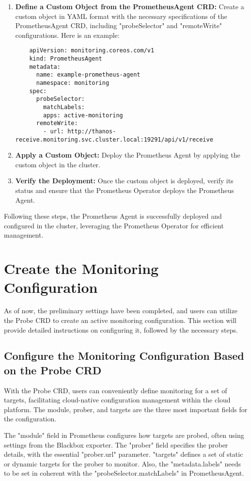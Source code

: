 \begin{enumerate}
\item \textbf{Define a Custom Object from the PrometheusAgent \ac{CRD}:}
Create a custom object in YAML format with the necessary specifications of the PrometheusAgent \ac{CRD}, including "probeSelector" and "remoteWrite" configurations. Here is an example:
\lstset{upquote=true}
\begin{lstlisting}
    apiVersion: monitoring.coreos.com/v1
    kind: PrometheusAgent
    metadata:
      name: example-prometheus-agent
      namespace: monitoring
    spec:
      probeSelector:
        matchLabels:
        apps: active-monitoring
      remoteWrite:
        - url: http://thanos-receive.monitoring.svc.cluster.local:19291/api/v1/receive
\end{lstlisting}
\item \textbf{Apply a Custom Object:}
Deploy the Prometheus Agent by applying the custom object in the cluster. 
\item \textbf{Verify the Deployment:}
Once the custom object is deployed, verify its status and ensure that the Prometheus Operator deploys the Prometheus Agent. 
\end{enumerate}

Following these steps, the Prometheus Agent is successfully deployed and configured in the cluster, leveraging the Prometheus Operator for efficient management. 

\section{Create the Monitoring Configuration}

As of now, the preliminary settings have been completed, and users can utilize the Probe \ac{CRD} to create an active monitoring configuration. This section will provide detailed instructions on configuring it, followed by the necessary steps. 

\subsection{Configure the Monitoring Configuration Based on the Probe \ac{CRD}}

With the Probe \ac{CRD}, users can conveniently define monitoring for a set of targets, facilitating cloud-native configuration management within the cloud platform. The module, prober, and targets are the three most important fields for the configuration. 

The "module" field in Prometheus configures how targets are probed, often using settings from the Blackbox exporter. The "prober" field specifies the prober details, with the essential "prober.url" parameter. "targets" defines a set of static or dynamic targets for the prober to monitor. Also, the "metadata.labels" needs to be set in coherent with the "probeSelector.matchLabels" in PrometheusAgent. 

